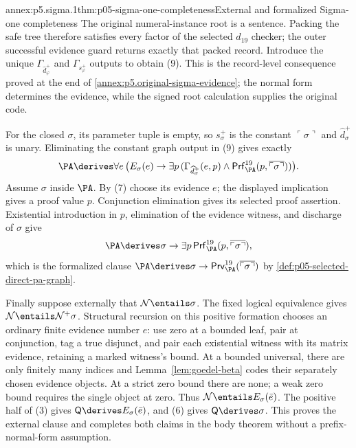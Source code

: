 \begin{annexitem}{annex:p5.sigma.1}{thm:p05-sigma-one-completeness}{External and formalized Sigma-one completeness}
The original numeral-instance root is a sentence. Packing the safe tree
therefore satisfies every factor of the selected \(d_{19}\) checker;
the outer successful evidence guard returns exactly that packed record.
Introduce the unique \(\Gamma_{\widehat d_\varphi^+}\) and
\(\Gamma_{s_\varphi^+}\) outputs to obtain (9). This is the
record-level consequence proved at the end of
\cref{annex:p5.original-sigma-evidence}; the normal form determines the
evidence, while the signed root calculation supplies the original code.

For the closed \(\sigma\), its parameter tuple is empty, so
\(s_\sigma^+\) is the constant \(\ulcorner\sigma\urcorner\) and
\(\widehat d_\sigma^+\) is unary. Eliminating the constant graph
output in (9) gives exactly
\[
 \PA\derives\forall e\,\bigl(E_\sigma(e)\to
  \exists p\,(\Gamma_{\widehat d_\sigma^+}(e,p)\land
   \mathsf{Prf}^{19}_{\PA}(p,\overline{\ulcorner\sigma\urcorner}))\bigr).
\]
Assume \(\sigma\) inside \(\PA\). By (7) choose its evidence
\(e\); the displayed implication gives a proof value \(p\).
Conjunction elimination gives its selected proof assertion. Existential
introduction in \(p\), elimination of the evidence witness, and discharge
of \(\sigma\) give
\[
 \PA\derives
 \sigma\to\exists p\,\mathsf{Prf}^{19}_{\PA}
   (p,\overline{\ulcorner\sigma\urcorner}),
\]
which is the formalized clause
\(\PA\derives\sigma\to
\mathsf{Prv}^{19}_{\PA}(\overline{\ulcorner\sigma\urcorner})\)
by \cref{def:p05-selected-direct-pa-graph}.

Finally suppose externally that \(\mathcal N\entails\sigma\). The fixed
logical equivalence gives \(\mathcal N\entails\mathcal N^+\sigma\).
Structural recursion on this positive formation chooses an ordinary finite
evidence number \(e\): use zero at a bounded leaf, pair at conjunction,
tag a true disjunct, and pair each existential witness with its matrix
evidence, retaining a marked witness's bound. At a bounded universal,
there are only finitely many indices and Lemma~\ref{lem:goedel-beta}
codes their separately chosen evidence objects. At a strict zero bound
there are none; a weak zero bound requires the single object at zero.
Thus \(\mathcal N\entails E_\sigma(\bar e)\).  The positive half of (3) gives
\(\mathsf Q\derives E_\sigma(\bar e)\), and (6) gives
\(\mathsf Q\derives\sigma\).  This proves the external clause and completes
both claims in the body theorem without a prefix-normal-form assumption.
\end{annexitem}

